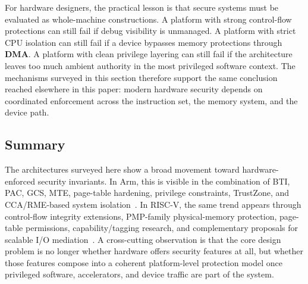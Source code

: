 For hardware designers, the practical lesson is that secure systems must be evaluated as whole-machine constructions. A platform with strong control-flow protections can still fail if debug visibility is unmanaged. A platform with strict CPU isolation can still fail if a device bypasses memory protections through \textbf{DMA}. A platform with clean privilege layering can still fail if the architecture leaves too much ambient authority in the most privileged software context. The mechanisms surveyed in this section therefore support the same conclusion reached elsewhere in this paper: modern hardware security depends on coordinated enforcement across the instruction set, the memory system, and the device path.

\subsection{Summary}

The architectures surveyed here show a broad movement toward hardware-enforced security invariants. In Arm, this is visible in the combination of BTI, PAC, GCS, MTE, page-table hardening, privilege constraints, TrustZone, and CCA/RME-based system isolation~\cite{armv-a,arm_trustzone_whitepaper,arm_cca_spec,arm_rme_spec}. In RISC-V, the same trend appears through control-flow integrity extensions, PMP-family physical-memory protection, page-table permissions, capability/tagging research, and complementary proposals for scalable I/O mediation~\cite{riscv_privileged,feng2024siopmp,kim2023rvcure,amar2023cheriot}. A cross-cutting observation is that the core design problem is no longer whether hardware offers security features at all, but whether those features compose into a coherent platform-level protection model once privileged software, accelerators, and device traffic are part of the system.
